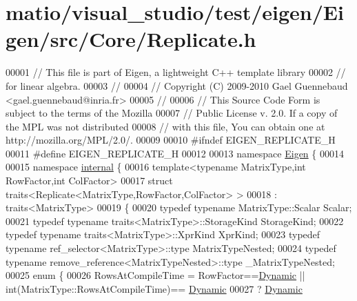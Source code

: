 \hypertarget{matio_2visual__studio_2test_2eigen_2_eigen_2src_2_core_2_replicate_8h_source}{}\section{matio/visual\+\_\+studio/test/eigen/\+Eigen/src/\+Core/\+Replicate.h}
\label{matio_2visual__studio_2test_2eigen_2_eigen_2src_2_core_2_replicate_8h_source}

\begin{DoxyCode}
00001 \textcolor{comment}{// This file is part of Eigen, a lightweight C++ template library}
00002 \textcolor{comment}{// for linear algebra.}
00003 \textcolor{comment}{//}
00004 \textcolor{comment}{// Copyright (C) 2009-2010 Gael Guennebaud <gael.guennebaud@inria.fr>}
00005 \textcolor{comment}{//}
00006 \textcolor{comment}{// This Source Code Form is subject to the terms of the Mozilla}
00007 \textcolor{comment}{// Public License v. 2.0. If a copy of the MPL was not distributed}
00008 \textcolor{comment}{// with this file, You can obtain one at http://mozilla.org/MPL/2.0/.}
00009 
00010 \textcolor{preprocessor}{#ifndef EIGEN\_REPLICATE\_H}
00011 \textcolor{preprocessor}{#define EIGEN\_REPLICATE\_H}
00012 
00013 \textcolor{keyword}{namespace }\hyperlink{namespace_eigen}{Eigen} \{ 
00014 
00015 \textcolor{keyword}{namespace }\hyperlink{namespaceinternal}{internal} \{
00016 \textcolor{keyword}{template}<\textcolor{keyword}{typename} MatrixType,\textcolor{keywordtype}{int} RowFactor,\textcolor{keywordtype}{int} ColFactor>
00017 \textcolor{keyword}{struct }traits<Replicate<MatrixType,RowFactor,ColFactor> >
00018  : traits<MatrixType>
00019 \{
00020   \textcolor{keyword}{typedef} \textcolor{keyword}{typename} MatrixType::Scalar Scalar;
00021   \textcolor{keyword}{typedef} \textcolor{keyword}{typename} traits<MatrixType>::StorageKind StorageKind;
00022   \textcolor{keyword}{typedef} \textcolor{keyword}{typename} traits<MatrixType>::XprKind XprKind;
00023   \textcolor{keyword}{typedef} \textcolor{keyword}{typename} ref\_selector<MatrixType>::type MatrixTypeNested;
00024   \textcolor{keyword}{typedef} \textcolor{keyword}{typename} remove\_reference<MatrixTypeNested>::type \_MatrixTypeNested;
00025   \textcolor{keyword}{enum} \{
00026     RowsAtCompileTime = RowFactor==\hyperlink{namespace_eigen_ad81fa7195215a0ce30017dfac309f0b2}{Dynamic} || int(MatrixType::RowsAtCompileTime)==
      \hyperlink{namespace_eigen_ad81fa7195215a0ce30017dfac309f0b2}{Dynamic}
00027                       ? \hyperlink{namespace_eigen_ad81fa7195215a0ce30017dfac309f0b2}{Dynamic}

\end{DoxyCode}
